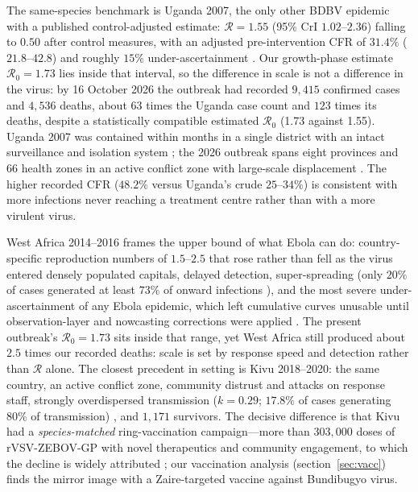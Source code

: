 \documentclass[preprint,12pt,numbers]{elsarticle}
\newcommand{\Reff}{\mathcal{R}}
\begin{document}
The same-species benchmark is Uganda 2007, the only other BDBV epidemic
with a published control-adjusted estimate: $\Reff=1.55$ (95\% CrI
$1.02$--$2.36$) falling to $0.50$ after control measures, with an
adjusted pre-intervention CFR of $31.4\%$ ($21.8$--$42.8$) and roughly
$15\%$ under-ascertainment \cite{DePadua2026}. Our growth-phase
estimate $\Reff_0=1.73$ lies inside that interval, so the difference in
scale is not a difference in the virus: by 16 October 2026 the outbreak
had recorded $9{,}415$ confirmed cases and $4{,}536$ deaths, about $63$
times the Uganda case count and $123$ times its deaths, despite a
statistically compatible estimated $\Reff_0$ (1.73 against 1.55). Uganda 2007 was contained within
months in a single district with an intact surveillance and isolation
system \cite{Wamala2010}; the 2026 outbreak spans eight provinces and 66
health zones in an active conflict zone with large-scale displacement
\cite{SSHAP2026}. The higher recorded CFR ($48.2\%$ versus Uganda's
crude $25$--$34\%$) is consistent with more infections never reaching a
treatment centre rather than with a more virulent virus.

West Africa 2014--2016 frames the upper bound of what Ebola can do:
country-specific reproduction numbers of $1.5$--$2.5$
\cite{Chowell2004,Nishiura2014} that rose rather than fell as the virus
entered densely populated capitals, delayed detection, super-spreading
(only $20\%$ of cases generated at least $73\%$ of onward infections
\cite{Kucharski2015}), and the most severe under-ascertainment of any
Ebola epidemic, which left cumulative curves unusable until
observation-layer and nowcasting corrections were applied
\cite{Pandey2014,Merler2015}. The present outbreak's $\Reff_0=1.73$
sits inside that range, yet West Africa still produced
about $2.5$ times our recorded deaths: scale is set by response speed
and detection rather than $\Reff$ alone. The closest precedent in
setting is Kivu 2018--2020: the same country, an active conflict zone,
community distrust and attacks on response staff, strongly overdispersed
transmission ($k=0.29$; $17.8\%$ of cases generating $80\%$ of
transmission) \cite{Soubrier2026}, and $1{,}171$ survivors. The decisive
difference is that Kivu had a \emph{species-matched} ring-vaccination
campaign---more than $303{,}000$ doses of rVSV-ZEBOV-GP with novel
therapeutics and community engagement, to which the decline is widely
attributed \cite{WHOKivu2020}; our vaccination analysis
(section~\ref{sec:vacc}) finds the mirror image with a Zaire-targeted
vaccine against Bundibugyo virus.
\end{document}
